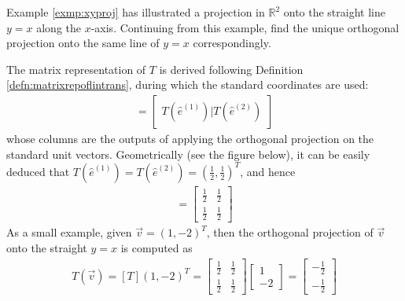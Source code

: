 \begin{exmp}
Example \ref{exmp:xyproj} has illustrated a projection in $\mathbb{R}^2$ onto the straight line $y = x$ along the $x$-axis. Continuing from this example, find the unique orthogonal projection onto the same line of $y = x$ correspondingly.
\end{exmp}
\begin{solution}
The matrix representation of $T$ is derived following Definition \ref{defn:matrixrepoflintrans}, during which the standard coordinates are used:
\begin{align*}
[T] =
\begin{bmatrix}
T(\hat{e}^{(1)})|T(\hat{e}^{(2)})
\end{bmatrix}
\end{align*}
whose columns are the outputs of applying the orthogonal projection on the standard unit vectors. Geometrically (see the figure below), it can be easily deduced that $T(\hat{e}^{(1)}) = T(\hat{e}^{(2)}) = (\frac{1}{2}, \frac{1}{2})^T$, and hence
\begin{align*}
[T] =
\begin{bmatrix}
\frac{1}{2} & \frac{1}{2} \\
\frac{1}{2} & \frac{1}{2} 
\end{bmatrix}
\end{align*}
As a small example, given $\vec{v}=(1,-2)^T$, then the orthogonal projection of $\vec{v}$ onto the straight $y=x$ is computed as
\begin{align*}
T(\vec{v}) = [T](1,-2)^T = 
\begin{bmatrix}
\frac{1}{2} & \frac{1}{2} \\
\frac{1}{2} & \frac{1}{2}     
\end{bmatrix}
\begin{bmatrix}
1 \\
-2
\end{bmatrix}
=
\begin{bmatrix}
-\frac{1}{2} \\
-\frac{1}{2}
\end{bmatrix}
\end{align*}
\par {}
\end{solution}
